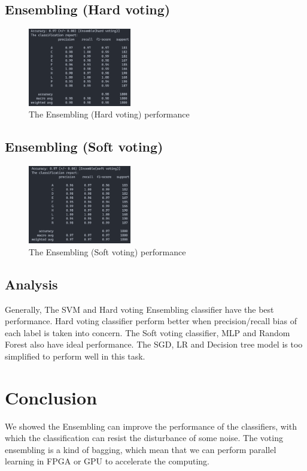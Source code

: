 \documentclass[11pt,en]{elegantpaper}
\begin{document}
\subsection*{Ensembling (Hard voting)}
\begin{figure}[H]
	\centering
	\includegraphics[width=0.4\textwidth]{image/hvpf}
	\caption{The Ensembling (Hard voting) performance}
	\label{hvpf}
\end{figure}

\subsection*{Ensembling (Soft voting)}
\begin{figure}[H]
	\centering
	\includegraphics[width=0.4\textwidth]{image/svpf}
	\caption{The Ensembling (Soft voting) performance}
	\label{svpf}
\end{figure}

\subsection{Analysis}
Generally, The SVM and Hard voting Ensembling classifier have the best performance. Hard voting classifier perform better when precision/recall bias of each label is taken into concern. The Soft voting classifier, MLP and Random Forest also have ideal performance. The SGD, LR and Decision tree model is too simplified to perform well in this task.

\section{Conclusion}
We showed the Ensembling can improve the performance of the classifiers, with which the classification can resist the disturbance of some noise. The voting ensembling is a kind of bagging, which mean that we can perform parallel learning in FPGA or GPU to accelerate the computing.



\end{document}
